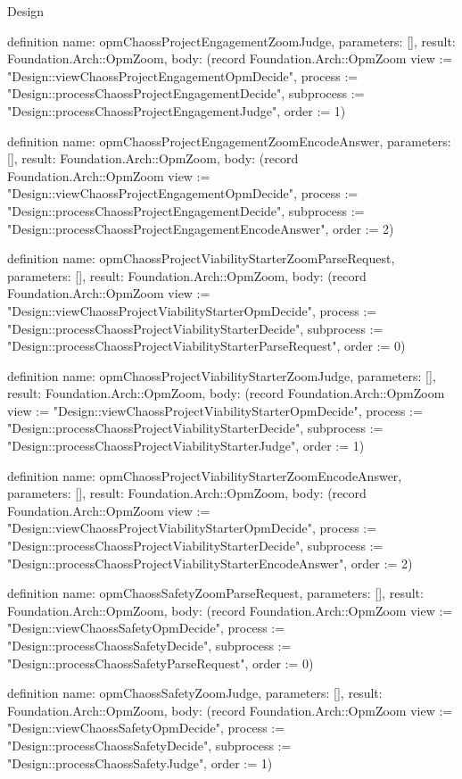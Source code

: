 \begin{lexlean}{Design}
\begin{semanticmodule}
definition{
  name: opmChaossProjectEngagementZoomJudge,
  parameters: [],
  result: Foundation.Arch::OpmZoom,
  body: (record Foundation.Arch::OpmZoom {view := "Design::viewChaossProjectEngagementOpmDecide", process := "Design::processChaossProjectEngagementDecide", subprocess := "Design::processChaossProjectEngagementJudge", order := 1})
}

definition{
  name: opmChaossProjectEngagementZoomEncodeAnswer,
  parameters: [],
  result: Foundation.Arch::OpmZoom,
  body: (record Foundation.Arch::OpmZoom {view := "Design::viewChaossProjectEngagementOpmDecide", process := "Design::processChaossProjectEngagementDecide", subprocess := "Design::processChaossProjectEngagementEncodeAnswer", order := 2})
}

definition{
  name: opmChaossProjectViabilityStarterZoomParseRequest,
  parameters: [],
  result: Foundation.Arch::OpmZoom,
  body: (record Foundation.Arch::OpmZoom {view := "Design::viewChaossProjectViabilityStarterOpmDecide", process := "Design::processChaossProjectViabilityStarterDecide", subprocess := "Design::processChaossProjectViabilityStarterParseRequest", order := 0})
}

definition{
  name: opmChaossProjectViabilityStarterZoomJudge,
  parameters: [],
  result: Foundation.Arch::OpmZoom,
  body: (record Foundation.Arch::OpmZoom {view := "Design::viewChaossProjectViabilityStarterOpmDecide", process := "Design::processChaossProjectViabilityStarterDecide", subprocess := "Design::processChaossProjectViabilityStarterJudge", order := 1})
}

definition{
  name: opmChaossProjectViabilityStarterZoomEncodeAnswer,
  parameters: [],
  result: Foundation.Arch::OpmZoom,
  body: (record Foundation.Arch::OpmZoom {view := "Design::viewChaossProjectViabilityStarterOpmDecide", process := "Design::processChaossProjectViabilityStarterDecide", subprocess := "Design::processChaossProjectViabilityStarterEncodeAnswer", order := 2})
}

definition{
  name: opmChaossSafetyZoomParseRequest,
  parameters: [],
  result: Foundation.Arch::OpmZoom,
  body: (record Foundation.Arch::OpmZoom {view := "Design::viewChaossSafetyOpmDecide", process := "Design::processChaossSafetyDecide", subprocess := "Design::processChaossSafetyParseRequest", order := 0})
}

definition{
  name: opmChaossSafetyZoomJudge,
  parameters: [],
  result: Foundation.Arch::OpmZoom,
  body: (record Foundation.Arch::OpmZoom {view := "Design::viewChaossSafetyOpmDecide", process := "Design::processChaossSafetyDecide", subprocess := "Design::processChaossSafetyJudge", order := 1})
}


\end{semanticmodule}
\end{lexlean}
